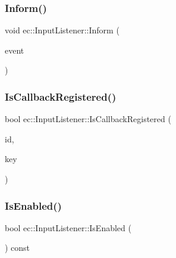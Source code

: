 \mbox{\label{classec_1_1_input_listener_afa340cac5b314410b157c1a63df32540}} 
\subsubsection{\texorpdfstring{Inform()}{Inform()}}
{\footnotesize\ttfamily void ec\+::\+Input\+Listener\+::\+Inform (\begin{DoxyParamCaption}\item[{const \mbox{\hyperlink{structec_1_1_input_event}{Input\+Event}} \&}]{event }\end{DoxyParamCaption})}

\mbox{\label{classec_1_1_input_listener_a82c8ee6b16d7b3a05d55aded95bcb658}} 
\subsubsection{\texorpdfstring{Is\+Callback\+Registered()}{IsCallbackRegistered()}}
{\footnotesize\ttfamily bool ec\+::\+Input\+Listener\+::\+Is\+Callback\+Registered (\begin{DoxyParamCaption}\item[{const std\+::string \&}]{id,  }\item[{\mbox{\hyperlink{namespaceec_a5de6bdb8c4b2ed6e590e721ec998f964}{Event\+Key\+\_\+T}}}]{key }\end{DoxyParamCaption})}

\mbox{\label{classec_1_1_input_listener_aab0a7d62f153cf1e10dfbfb58517e063}} 
\subsubsection{\texorpdfstring{Is\+Enabled()}{IsEnabled()}}
{\footnotesize\ttfamily bool ec\+::\+Input\+Listener\+::\+Is\+Enabled (\begin{DoxyParamCaption}{ }\end{DoxyParamCaption}) const\hspace{0.3cm}{\ttfamily [virtual]}}

